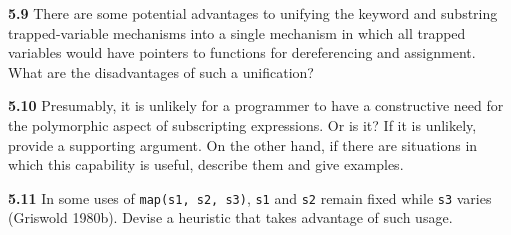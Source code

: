 \noindent\textbf{5.9} There are some potential advantages to unifying
the keyword and substring trapped-variable mechanisms into a single
mechanism in which all trapped variables would have pointers to
functions for dereferencing and assignment. What are the disadvantages
of such a unification?

\noindent\textbf{5.10} Presumably, it is unlikely for a programmer to
have a constructive need for the polymorphic aspect of subscripting
expressions. Or is it? If it is unlikely, provide a supporting
argument. On the other hand, if there are situations in which this
capability is useful, describe them and give examples.

\noindent\textbf{5.11} In some uses of \texttt{map(s1, s2, s3)}, \texttt{s1}
and \texttt{s2} remain fixed while \texttt{s3} varies (Griswold
1980b). Devise a heuristic that takes advantage of such usage.
